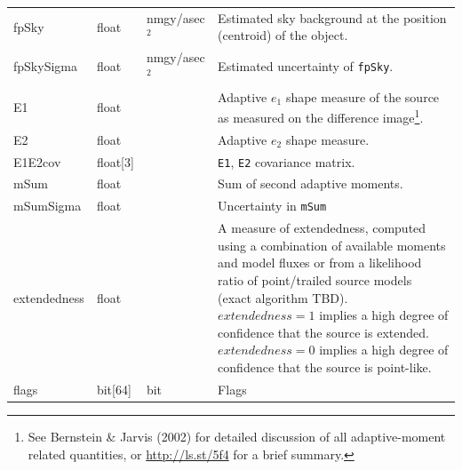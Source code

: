 \documentclass[12pt]{article}
\begin{document}
\begin{center}
\begin{longtable}{p{3cm}p{2cm}p{2cm}p{5cm}}
fpSky & float & nmgy/asec$^{2}$ & Estimated sky background at the position (centroid) of the object. \\ 

fpSkySigma & float & nmgy/asec$^{2}$ & Estimated uncertainty of \texttt{fpSky}. \\ 



E1 & float & ~ & Adaptive $e_1$ shape measure of the source as measured on the difference image\footnote{See Bernstein \& Jarvis (2002) for detailed discussion of all adaptive-moment related quantities, or \url{http://ls.st/5f4} for a brief summary.}. \\

E2 & float & ~ & Adaptive $e_2$ shape measure. \\

E1E2cov & float[3] & ~ & {\tt E1}, {\tt E2} covariance matrix. \\

mSum & float & ~ & Sum of second adaptive moments. \\

mSumSigma & float & ~ & Uncertainty in {\tt mSum} \\

extendedness & float & ~ & A measure of extendedness, computed using a combination of available moments and model fluxes or from a likelihood ratio of point/trailed source models (exact algorithm TBD). $extendedness=1$ implies a high degree of confidence that the source is extended. $extendedness=0$ implies a high degree of confidence that the source is point-like. \\

flags & bit[64] & bit & Flags \\ \hline
\end{longtable}
\end{center}
\end{document}
